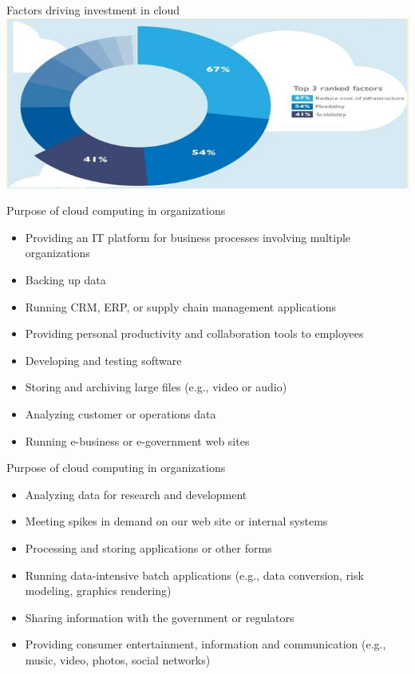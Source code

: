\documentclass{SKP-beamer}
\begin{document}
\begin{frame}{Factors driving investment in cloud}
	\includegraphics[scale=0.8]{e.png}
\end{frame}

\begin{frame}{Purpose of cloud computing in organizations}
	\begin{itemize}
		\item Providing an IT platform for business processes involving multiple organizations
		\item Backing up data
		\item Running CRM, ERP, or supply chain management applications
		\item Providing personal productivity and collaboration tools to employees
		\item Developing and testing software
		\item Storing and archiving large files (e.g., video or audio)
		\item Analyzing customer or operations data
		\item Running e-business or e-government web sites	
	\end{itemize}
\end{frame}

\begin{frame}{Purpose of cloud computing in organizations}
	\begin{itemize}
		\item Analyzing data for research and development
		\item Meeting spikes in demand on our web site or internal systems
		\item Processing and storing applications or other forms
		\item Running data-intensive batch applications (e.g., data conversion, risk modeling, graphics rendering)
		\item Sharing information with the government or regulators
		\item Providing consumer entertainment, information and communication (e.g., music,
		video, photos, social networks)		
	\end{itemize}
\end{frame}
\end{document}
